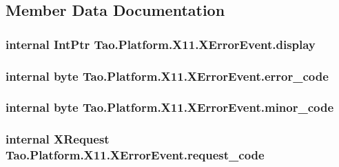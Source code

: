 \subsection{Member Data Documentation}
\hypertarget{struct_tao_1_1_platform_1_1_x11_1_1_x_error_event_a1c2349bff48f8ba7d97c21e4999bc946}{
\subsubsection[{display}]{\setlength{\rightskip}{0pt plus 5cm}internal IntPtr {\bf Tao.Platform.X11.XErrorEvent.display}}}
\label{struct_tao_1_1_platform_1_1_x11_1_1_x_error_event_a1c2349bff48f8ba7d97c21e4999bc946}
\hypertarget{struct_tao_1_1_platform_1_1_x11_1_1_x_error_event_ade74cd0527540ddcfdca4b2b4722f082}{
\subsubsection[{error\_\-code}]{\setlength{\rightskip}{0pt plus 5cm}internal byte {\bf Tao.Platform.X11.XErrorEvent.error\_\-code}}}
\label{struct_tao_1_1_platform_1_1_x11_1_1_x_error_event_ade74cd0527540ddcfdca4b2b4722f082}
\hypertarget{struct_tao_1_1_platform_1_1_x11_1_1_x_error_event_a5f21b4348fdc2d8932fe90945b66d409}{
\subsubsection[{minor\_\-code}]{\setlength{\rightskip}{0pt plus 5cm}internal byte {\bf Tao.Platform.X11.XErrorEvent.minor\_\-code}}}
\label{struct_tao_1_1_platform_1_1_x11_1_1_x_error_event_a5f21b4348fdc2d8932fe90945b66d409}
\hypertarget{struct_tao_1_1_platform_1_1_x11_1_1_x_error_event_ac14a145f2eab548be2fceafa5f6c25ff}{
\subsubsection[{request\_\-code}]{\setlength{\rightskip}{0pt plus 5cm}internal {\bf XRequest} {\bf Tao.Platform.X11.XErrorEvent.request\_\-code}}}
